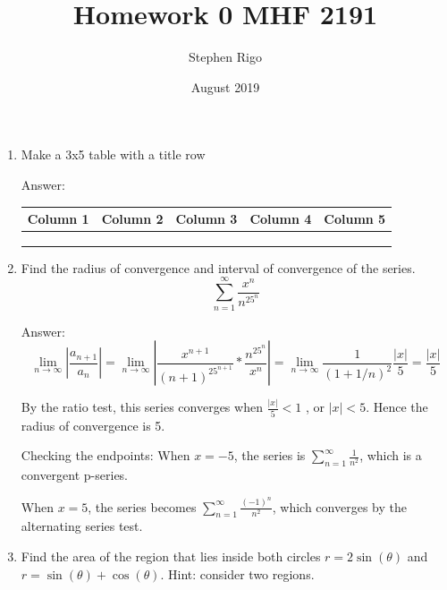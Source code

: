 \documentclass{article}
\title{Homework 0 MHF 2191}
\author{Stephen Rigo }
\date{August 2019}
\begin{document}
\maketitle

\begin{enumerate}
    \item 
Make a 3x5 table with a title row

Answer:
    \begin{table}[htbp]
        \centering
        \begin{tabular}{|c|c|c|c|c|}
        \hline
             Column 1 & Column 2 & Column 3 & Column 4 & Column 5\\
        \hline
                      &          &          &          &         \\
        \hline
                      &          &          &          &         \\
        \hline
                      &          &          &          &         \\
        \hline
        
        \end{tabular}
        \label{tab:my_label}
    \end{table}



    
\item
Find the radius of convergence and interval of convergence of the series.
    \begin{equation}
        \sum_{n=1}^{\infty} \frac{x^n}{n^25^n}
        \end{equation}
        
        Answer:
        $$ \lim_{n\to\infty} \left|\frac{a_{n+1}}{a_{n}}\right| = \lim_{n\to\infty}\left|\frac{x^{n+1}}{(n+1)^25^{n+1}}*\frac{n^25^n}{x^n}\right| = \lim_{n\to\infty} \frac{1}{(1+1/n)^2}\frac{|x|}{5} = \frac{|x|}{5}  $$
        
        By the ratio test, this series converges when $ \frac{|x|}{5}<1 $ , or $|x|<5$. Hence the radius of convergence is 5. 
        
        Checking the endpoints: When $x=-5$, the series is $\sum_{n=1}^{\infty} \frac{1}{n^2}$, which is a convergent p-series. 
        
        When $x=5$, the series becomes $\sum_{n=1}^{\infty} \frac{(-1)^n}{n^2}$, which converges by the alternating series test.
        



\item
Find the area of the region that lies inside both circles $r=2\sin(\theta)$ and $r=\sin(\theta)+\cos(\theta)$. Hint: consider two regions.


\end{enumerate}
\end{document}
